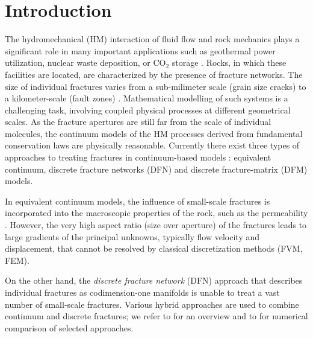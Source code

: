\documentclass[a4paper]{article}
\numberwithin{equation}{section}
\begin{document}
\section{Introduction}
The hydromechanical (HM) interaction of fluid flow and rock mechanics plays a significant role in many important applications such as geothermal power utilization, nuclear waste deposition, or CO${}_2$ storage \cite{rutqvist2003role}.
Rocks, in which these facilities are located, are characterized by the presence of fracture networks. The size of individual fractures varies from a sub-milimeter scale (grain size cracks) to a kilometer-scale (fault zones) \cite{Bonnet2001}.
Mathematical modelling of such systems is a challenging task, involving coupled physical processes at different geometrical scales.
As the fracture apertures are still far from the scale of individual molecules, the continuum models of the HM processes derived from fundamental conservation laws are physically reasonable.
Currently there exist three types of approaches to treating fractures in continuum-based models \cite{berre2019flow}: equivalent continuum, discrete fracture networks (DFN) and discrete fracture-matrix (DFM) models.

In equivalent continuum models, the influence of small-scale fractures is incorporated into the macroscopic properties of the rock, such as the permeability \cite{Oda1986,Rutqvist2013a}. However, the very high aspect ratio (size over aperture) of the fractures leads to large gradients of the principal unknowns, typically flow velocity and displacement, that cannot be resolved by classical discretization methods (FVM, FEM).
 
On the other hand, the \textit{discrete fracture network} (DFN) approach \cite{Follin2014methodology,Hyman2015dfnWorks} that describes individual fractures as codimension-one manifolds is unable to treat a vast number of small-scale fractures. Various hybrid approaches are used to combine continuum and discrete fractures; we refer to \cite{Jing2002} for an overview and to \cite{Zhao2013Impact} for numerical comparison of selected approaches.
\end{document}
